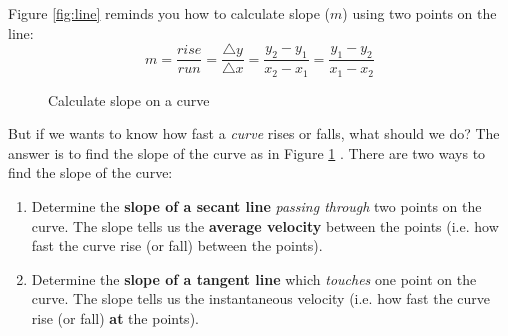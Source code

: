 \noindent Figure \ref{fig:line} reminds you how to calculate slope ($m$) using two points on the line:
\begin{equation}
    m=\frac{rise}{run}=\frac{\triangle y}{\triangle x}=\frac{y_2-y_1}{x_2-x_1}=\frac{y_1-y_2}{x_1-x_2}
\end{equation}
\hfill \break
\hfill \break
\hfill \break
\hfill \break
\hfill \break
\hfill \break



\begin{multicols}{2}

\begin{minipage}{0.35\textwidth}

\begin{figure}[H]
    
    \caption{Calculate slope on a curve}
    \label{fig:curve1}
\end{figure}
\end{minipage}

\begin{minipage}{0.55\textwidth}
\vspace{0.7cm}
\noindent But if we wants to know how fast a \emph{curve} rises or falls, what should we do? The answer is to find the slope of the curve as in Figure \ref{fig:curve1} . There are two ways to find the slope of the curve: 

\begin{enumerate}[leftmargin=*]
    \item Determine the \textbf{slope of a secant line} \emph{passing through} two points on the curve. The slope tells us the \textbf{average velocity} between the points (i.e. how fast the curve rise (or fall) between the points).
    \item Determine the \textbf{slope of a tangent line} which \emph{touches} one point on the curve. The slope tells us the instantaneous velocity (i.e. how fast the curve rise (or fall) \textbf{at} the points).
\end{enumerate}
\end{minipage}
\end{multicols}

